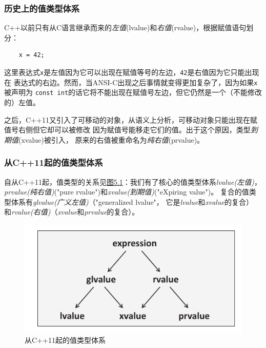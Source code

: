 \subsubsection*{历史上的值类型体系}
C++以前只有从C语言继承而来的\emph{左值}(lvalue)和\emph{右值}(rvalue)，根据赋值语句划分：
\begin{lstlisting}
    x = 42;
\end{lstlisting}
这里表达式\texttt{x}是左值因为它可以出现在赋值等号的左边，\texttt{42}是右值因为它只能出现在
表达式的右边。然而，当ANSI-C出现之后事情就变得更加复杂了，因为如果\texttt{x}被声明为
\texttt{const int}的话它将不能出现在赋值号左边，但它仍然是一个（不能修改的）左值。

之后，C++11又引入了可移动的对象，从语义上分析，可移动对象只能出现在赋值号右侧但它却可以被修改
因为赋值号能移走它们的值。出于这个原因，类型\emph{到期值}(xvalue)被引入，
原来的右值被重命名为\emph{纯右值}(prvalue)。

\subsubsection*{从C++11起的值类型体系}
自从C++11起，值类型的关系见\hyperref[f5.1]{图5.1}：我们有了核心的值类型体系\emph{lvalue(左值)}，
\emph{prvalue(纯右值)}("pure rvalue")和\emph{xvalue(到期值)}("eXpiring value")。
复合的值类型体系有\emph{glvalue(广义左值)}（"generalized lvalue"，
它是\emph{lvalue}和\emph{xvalue}的复合）
和\emph{rvalue(右值)}（\emph{xvalue}和\emph{prvalue}的复合）。

\begin{figure}[ht]
    \begin{center}
        \includegraphics[scale=0.8]{../imgs/5.1.png}
        \caption{从C++11起的值类型体系}
        \label{f5.1}
    \end{center}
\end{figure}

